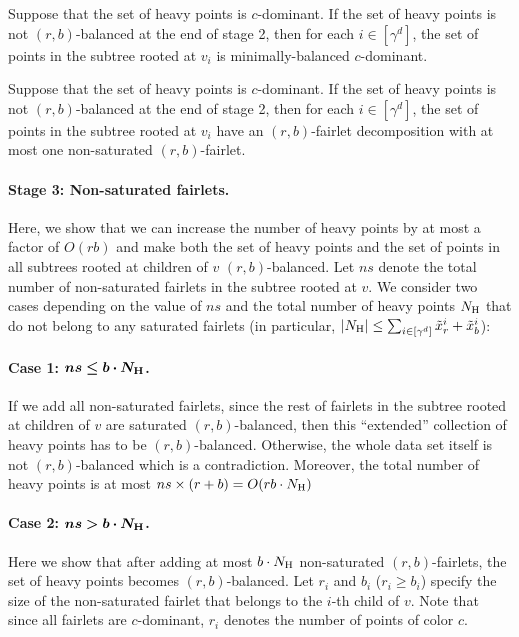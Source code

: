 \begin{lemma}\label{lem:structure-phase-2}
Suppose that the set of heavy points is $c$-dominant. If the set of heavy points is not $(r,b)$-balanced at the end of stage 2, then for each $i\in [\gamma^d]$, the set of points in the subtree rooted at $v_i$ is minimally-balanced $c$-dominant.
\end{lemma}
\begin{corollary}\label{cor:non-maximal}
Suppose that the set of heavy points is $c$-dominant. If the set of heavy points is not $(r,b)$-balanced at the end of stage 2, then for each $i\in [\gamma^d]$, the set of points in the subtree rooted at $v_i$ have an $(r,b)$-fairlet decomposition with at most one {non-saturated} $(r,b)$-fairlet. 
\end{corollary}

\paragraph{Stage 3: Non-saturated fairlets.}
Here, we show that we can increase the number of heavy points by at most a factor of $O(rb)$ %
and make both the set of heavy points and the set of points in all subtrees rooted at children of $v$ $(r,b)$-balanced. Let $ns$ denote the total number of non-saturated fairlets in the subtree rooted at $v$. We consider two cases depending on the value of $ns$ and the total number of heavy points $N_{\mathrm{H}}$ that do not belong to any saturated fairlets (in particular, $|N_{\mathrm{H}}| \leq \sum_{i\in[\gamma^d]} \tilde{x}^i_r + \tilde{x}^i_b$): 

\paragraph{Case 1: $\boldsymbol{ns \leq b\cdot N_{\mathrm{H}}}$.}
If we add all non-saturated fairlets, since the rest of fairlets in the subtree rooted at children of $v$ are saturated $(r,b)$-balanced, then this ``extended'' collection of heavy points has to be $(r,b)$-balanced. Otherwise, the whole data set itself is not $(r,b)$-balanced which is a contradiction. Moreover, the total number of heavy points is at most $ns \times (r+b) = O(rb\cdot N_{\mathrm{H}})$

\paragraph{Case 2: $\boldsymbol{ns > b\cdot N_{\mathrm{H}}}$.} 
Here we show that after adding at most $b \cdot N_{\mathrm{H}}$ non-saturated $(r,b)$-fairlets, the set of heavy points becomes $(r,b)$-balanced. Let $r_i$ and $b_i$ ($r_i\geq b_i$) specify the size of the non-saturated fairlet that belongs to the $i$-th child of $v$. Note that since all fairlets are $c$-dominant, $r_i$ denotes the number of points of color $c$.  

